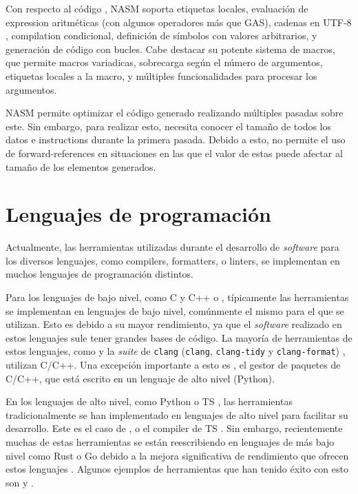 Con respecto al código , NASM soporta etiquetas
locales, evaluación de \gls{expression} aritméticas (con algunos operadores más
que GAS), cadenas en UTF-8 \parencite{UTF-8}, \gls{compilation} condicional,
definición de símbolos con valores arbitrarios, y generación de código con
bucles. Cabe destacar su potente sistema de macros, que permite macros
variadicas, sobrecarga según el número de argumentos, etiquetas locales a la
macro, y múltiples funcionalidades para procesar los argumentos.

NASM permite optimizar el código generado realizando múltiples pasadas sobre
este. Sin embargo, para realizar esto, necesita conocer el tamaño de todos los
datos e \glspl{instruction} durante la primera pasada. Debido a esto, no permite
el uso de \glspl{forward-reference} en situaciones en las que el valor de estas
puede afectar al tamaño de los elementos generados. \parencite{NASM-manual}

\section{Lenguajes de programación}

Actualmente, las herramientas utilizadas durante el desarrollo de
\textit{software} para los diversos lenguajes, como \glspl{compiler},
\glspl{formatter}, o \glspl{linter}, se implementan en muchos lenguajes de
programación distintos.

Para los lenguajes de bajo nivel, como C \parencite{C} y C++ \parencite{cpp} o
, típicamente las herramientas se implementan en
lenguajes de bajo nivel, comúnmente el mismo para el que se utilizan. Esto es
debido a su mayor rendimiento, ya que el \textit{software} realizado en estos
lenguajes sule tener grandes bases de código. La mayoría de herramientas de
estos lenguajes, como  y la \textit{suite} de \verb!clang!
(\verb!clang!, \verb!clang-tidy! y \verb!clang-format!) \parencite{clang},
utilizan C/C++. Una excepción importante a esto es , el gestor de
paquetes de C/C++, que está escrito en un lenguaje de alto nivel (Python).

En los lenguajes de alto nivel, como Python \parencite{Python} o \gls{TS}
\parencite{typescript}, las herramientas tradicionalmente se han implementado en
lenguajes de alto nivel para facilitar su desarrollo. Este es el caso de
,  o el \gls{compiler} de \gls{TS}
\parencite{tsc}. Sin embargo, recientemente muchas de estas herramientas se
están reescribiendo en lenguajes de más bajo nivel como Rust \parencite{Rust} o
Go \parencite{Go} debido a la mejora significativa de rendimiento que ofrecen
estos lenguajes \parencite{typescript-go}. Algunos ejemplos de herramientas que
han tenido éxito con esto son  y .


